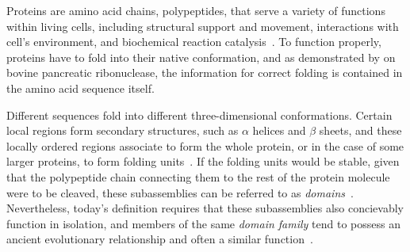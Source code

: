

Proteins are amino acid chains, polypeptides, that serve a variety of functions within
living cells, including structural support and movement, interactions with cell's
environment, and biochemical reaction catalysis~\cite{alberts2018molecular}.
To function properly, proteins have to fold into their native conformation, and as
demonstrated by \citet{anfinsen1961kinetics} on bovine pancreatic ribonuclease, the
information for correct folding is contained in the amino acid sequence itself.

Different sequences fold into different three-dimensional conformations.
Certain local regions form secondary structures, such as $\alpha$ helices and $\beta$
sheets, and these locally ordered regions associate to form the whole protein, or in the
case of some larger proteins, to form folding units~\cite{levitt1975computer}.
If the folding units would be stable, given that the polypeptide chain connecting them
to the rest of the protein molecule were to be cleaved, these subassemblies can be
referred to as \emph{domains}~\cite{goldberg1969tertiary, levitt1975computer}.
Nevertheless, today's definition requires that these subassemblies also concievably
function in isolation, and members of the same \emph{domain family} tend to possess an
ancient evolutionary relationship and often a similar function~\cite{ponting2002natural}.





